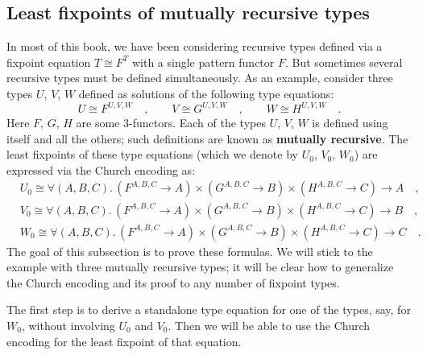 \subsection{Least fixpoints of mutually recursive types\label{subsec:Least-fixpoints-of-mutually-recursive-types}}

In most of this book, we have been considering recursive types defined
via a fixpoint equation $T\cong F^{T}$ with a single pattern functor
$F$. But sometimes several recursive types must be defined simultaneously.
As an example, consider three types $U$, $V$, $W$ defined as solutions
of the following type equations:
\[
U\cong F^{U,V,W}\quad,\quad\quad V\cong G^{U,V,W}\quad,\quad\quad W\cong H^{U,V,W}\quad.
\]
Here $F$, $G$, $H$ are some $3$-functors. Each of the types $U$,
$V$, $W$ is defined using itself and all the others; such definitions
are known as \textbf{mutually recursive}.
The least fixpoints of these type equations (which we denote by $U_{0}$,
$V_{0}$, $W_{0}$) are expressed via the Church encoding as:
\begin{align*}
 & U_{0}\cong\forall(A,B,C).\,(F^{A,B,C}\rightarrow A)\times(G^{A,B,C}\rightarrow B)\times(H^{A,B,C}\rightarrow C)\rightarrow A\quad,\\
 & V_{0}\cong\forall(A,B,C).\,(F^{A,B,C}\rightarrow A)\times(G^{A,B,C}\rightarrow B)\times(H^{A,B,C}\rightarrow C)\rightarrow B\quad,\\
 & W_{0}\cong\forall(A,B,C).\,(F^{A,B,C}\rightarrow A)\times(G^{A,B,C}\rightarrow B)\times(H^{A,B,C}\rightarrow C)\rightarrow C\quad.
\end{align*}
The goal of this subsection is to prove these formulas. We will stick
to the example with three mutually recursive types; it will be clear
how to generalize the Church encoding and its proof to any number
of fixpoint types.

The first step is to derive a standalone type equation for one of
the types, say, for $W_{0}$, without involving $U_{0}$ and $V_{0}$.
Then we will be able to use the Church encoding for the least fixpoint
of that equation.

